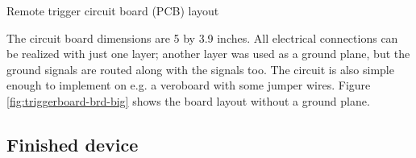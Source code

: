 {Remote trigger circuit board (PCB) layout}

The circuit board dimensions are 5 by 3.9 inches.
All electrical connections can be realized with just one layer;
another layer was used as a ground plane, but the ground signals are routed along with the signals too.
The circuit is also simple enough to implement on e.g. a veroboard with some jumper wires.
Figure \ref{fig:triggerboard-brd-big} shows the board layout without a ground plane.

\subsection{Finished device}

